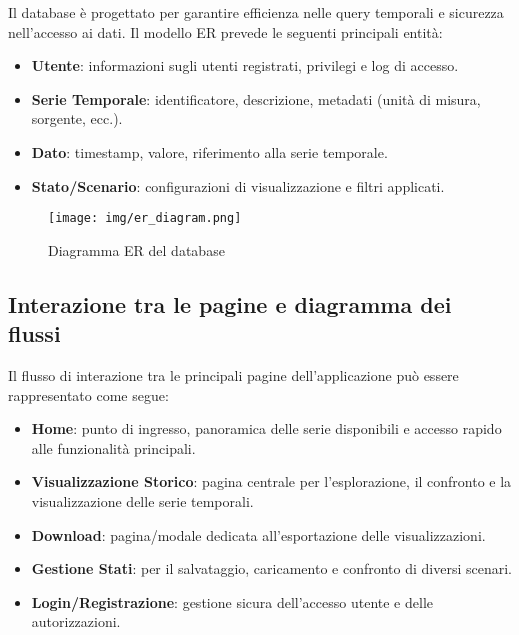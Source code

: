Il database è progettato per garantire efficienza nelle query temporali e sicurezza nell’accesso ai dati. Il modello ER prevede le seguenti principali entità:

\begin{itemize}
    \item \textbf{Utente}: informazioni sugli utenti registrati, privilegi e log di accesso.
    \item \textbf{Serie Temporale}: identificatore, descrizione, metadati (unità di misura, sorgente, ecc.).
    \item \textbf{Dato}: timestamp, valore, riferimento alla serie temporale.
    \item \textbf{Stato/Scenario}: configurazioni di visualizzazione e filtri applicati.
\end{itemize}

\vspace{0.5cm}
\begin{figure}[h!]
    \centering
    \texttt{[image: img/er\_diagram.png]}
    \caption{Diagramma ER del database}
    \label{fig:er_diagram}
\end{figure}
\vspace{0.5cm}

\subsection{Interazione tra le pagine e diagramma dei flussi}

Il flusso di interazione tra le principali pagine dell’applicazione può essere rappresentato come segue:

\begin{itemize}
    \item \textbf{Home}: punto di ingresso, panoramica delle serie disponibili e accesso rapido alle funzionalità principali.
    \item \textbf{Visualizzazione Storico}: pagina centrale per l’esplorazione, il confronto e la visualizzazione delle serie temporali.
    \item \textbf{Download}: pagina/modale dedicata all’esportazione delle visualizzazioni.
    \item \textbf{Gestione Stati}: per il salvataggio, caricamento e confronto di diversi scenari.
    \item \textbf{Login/Registrazione}: gestione sicura dell’accesso utente e delle autorizzazioni.
\end{itemize}

